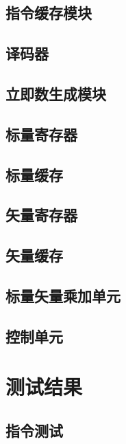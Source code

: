 \documentclass[UTF8]{ctexart}
\begin{document}
\subsection{指令缓存模块}

\subsection{译码器}

\subsection{立即数生成模块}

\subsection{标量寄存器}

\subsection{标量缓存}

\subsection{矢量寄存器}

\subsection{矢量缓存}

\subsection{标量矢量乘加单元}

\subsection{控制单元}

\section{测试结果}

\subsection{指令测试}
\end{document}
